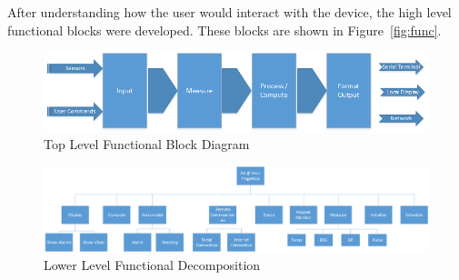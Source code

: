 \documentclass[12pt]{article} %
\begin{document}
    After understanding how the user would interact with the device, the high level
    functional blocks were developed. These blocks are shown in
    Figure~\ref{fig:func}. 


    \begin{figure}[h]
      \centering
      \includegraphics[width=\textwidth]{../design/top_level_function_block_diagram}
      \caption{Top Level Functional Block Diagram}
      \label{fig:func_top}
    \end{figure}

    \begin{figure}[h]
      \centering
      \includegraphics[width=\textwidth]{../design/Functional_decomposition}
      \caption{Lower Level Functional Decomposition}
      \label{fig:func_low}
    \end{figure}
\end{document}
